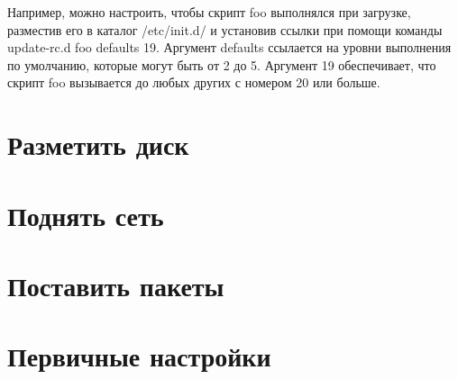 \documentclass[12pt,a4paper]{article}
\begin{document}
Например, можно настроить, чтобы скрипт foo выполнялся при загрузке, разместив его в каталог /etc/init.d/ и установив ссылки при помощи команды update-rc.d foo defaults 19. Аргумент defaults ссылается на уровни выполнения по умолчанию, которые могут быть от 2 до 5. Аргумент 19 обеспечивает, что скрипт foo вызывается до любых других с номером 20 или больше.
\section{Разметить диск}
\section{Поднять сеть}
\section{Поставить пакеты}
\section{Первичные настройки}
\end{document}

